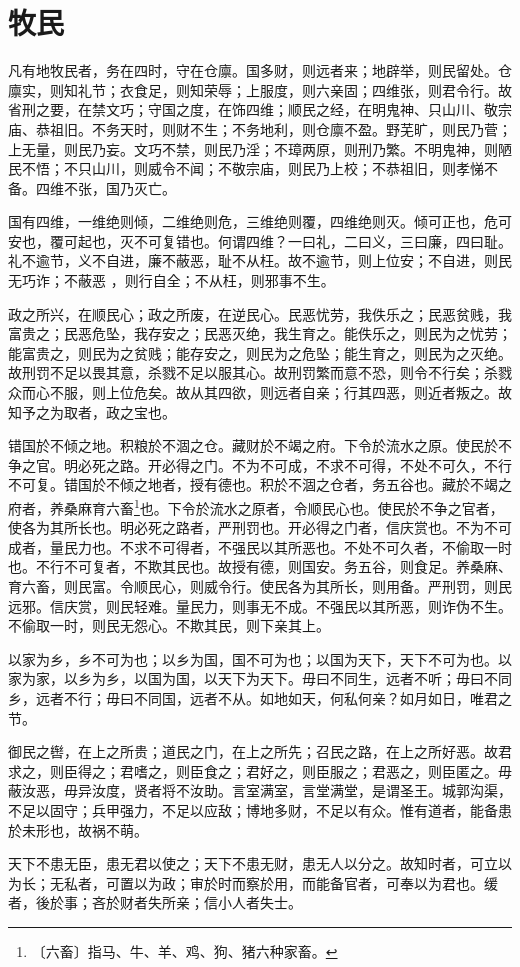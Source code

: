 \documentclass[12pt,UTF-8,openany]{ctexbook}
\begin{document}
\chapter{牧民}

\begin{normalsize}
    
    凡有地牧民者，务在四时，守在仓廪。国多财，则远者来；地辟举，则民留处。仓廪实，则知礼节；衣食足，则知荣辱；上服度，则六亲固；四维张，则君令行。故省刑之要，在禁文巧；守国之度，在饰四维；顺民之经，在明鬼神、只山川、敬宗庙、恭祖旧。不务天时，则财不生；不务地利，则仓廪不盈。野芜旷，则民乃菅；上无量，则民乃妄。文巧不禁，则民乃淫；不璋两原，则刑乃繁。不明鬼神，则陋民不悟；不只山川，则威令不闻；不敬宗庙，则民乃上校；不恭祖旧，则孝悌不备。四维不张，国乃灭亡。
    
    国有四维，一维绝则倾，二维绝则危，三维绝则覆，四维绝则灭。倾可正也，危可安也，覆可起也，灭不可复错也。何谓四维？一曰礼，二曰义，三曰廉，四曰耻。礼不逾节，义不自进，廉不蔽恶，耻不从枉。故不逾节，则上位安；不自进，则民无巧诈；不蔽恶 ，则行自全；不从枉，则邪事不生。
    
    政之所兴，在顺民心；政之所废，在逆民心。民恶忧劳，我佚乐之；民恶贫贱，我富贵之；民恶危坠，我存安之；民恶灭绝，我生育之。能佚乐之，则民为之忧劳；能富贵之，则民为之贫贱；能存安之，则民为之危坠；能生育之，则民为之灭绝。故刑罚不足以畏其意，杀戮不足以服其心。故刑罚繁而意不恐，则令不行矣；杀戮众而心不服，则上位危矣。故从其四欲，则远者自亲；行其四恶，则近者叛之。故知予之为取者，政之宝也。
    
    错国於不倾之地。积粮於不涸之仓。藏财於不竭之府。下令於流水之原。使民於不争之官。明必死之路。开必得之门。不为不可成，不求不可得，不处不可久，不行不可复。错国於不倾之地者，授有德也。积於不涸之仓者，务五谷也。藏於不竭之府者，养桑麻育六畜\footnote{〔六畜〕指马、牛、羊、鸡、狗、猪六种家畜。}也。下令於流水之原者，令顺民心也。使民於不争之官者，使各为其所长也。明必死之路者，严刑罚也。开必得之门者，信庆赏也。不为不可成者，量民力也。不求不可得者，不强民以其所恶也。不处不可久者，不偷取一时也。不行不可复者，不欺其民也。故授有德，则国安。务五谷，则食足。养桑麻、育六畜，则民富。令顺民心，则威令行。使民各为其所长，则用备。严刑罚，则民远邪。信庆赏，则民轻难。量民力，则事无不成。不强民以其所恶，则诈伪不生。不偷取一时，则民无怨心。不欺其民，则下亲其上。
    
    以家为乡，乡不可为也；以乡为国，国不可为也；以国为天下，天下不可为也。以家为家，以乡为乡，以国为国，以天下为天下。毋曰不同生，远者不听；毋曰不同乡，远者不行；毋曰不同国，远者不从。如地如天，何私何亲？如月如日，唯君之节。
    
    御民之辔，在上之所贵；道民之门，在上之所先；召民之路，在上之所好恶。故君求之，则臣得之；君嗜之，则臣食之；君好之，则臣服之；君恶之，则臣匿之。毋蔽汝恶，毋异汝度，贤者将不汝助。言室满室，言堂满堂，是谓圣王。城郭沟渠，不足以固守；兵甲强力，不足以应敌；博地多财，不足以有众。惟有道者，能备患於未形也，故祸不萌。
    
    天下不患无臣，患无君以使之；天下不患无财，患无人以分之。故知时者，可立以为长；无私者，可置以为政；审於时而察於用，而能备官者，可奉以为君也。缓者，後於事；吝於财者失所亲；信小人者失士。
\end{normalsize}
\end{document}
